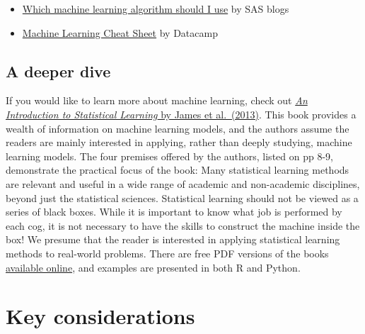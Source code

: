 \documentclass[
]{book}
\providecommand{\tightlist}{%
  \setlength{\itemsep}{0pt}\setlength{\parskip}{0pt}}
\begin{document}
\begin{itemize}
\tightlist
\item
  \href{https://blogs.sas.com/content/subconsciousmusings/2020/12/09/machine-learning-algorithm-use/}{Which machine learning algorithm should I use} by SAS blogs
\item
  \href{https://www.datacamp.com/cheat-sheet/machine-learning-cheat-sheet?utm_source=google\&utm_medium=paid_search\&utm_campaignid=19589720830\&utm_adgroupid=157098107695\&utm_device=c\&utm_keyword=\&utm_matchtype=\&utm_network=g\&utm_adpostion=\&utm_creative=698229375346\&utm_targetid=dsa-2264919291829\&utm_loc_interest_ms=\&utm_loc_physical_ms=9009732\&utm_content=DSA~blog~Julia\&utm_campaign=230119_1-sea~dsa~tofu_2-b2c_3-us_4-prc_5-na_6-na_7-le_8-pdsh-go_9-na_10-na_11-na-may24\&gad_source=1\&gclid=Cj0KCQjw6PGxBhCVARIsAIumnWai3I4X4UtrhM_2dA1pUpmAmC-iErsp57Cv6p4fEQugIVbGrx1VT2YaAsr7EALw_wcB}{Machine Learning Cheat Sheet} by Datacamp
\end{itemize}

\hypertarget{a-deeper-dive}{%
\section{A deeper dive}\label{a-deeper-dive}}

If you would like to learn more about machine learning, check out \href{https://www.statlearning.com/}{\emph{An Introduction to Statistical Learning} by James et al.~(2013)}. This book provides a wealth of information on machine learning models, and the authors assume the readers are mainly interested in applying, rather than deeply studying, machine learning models. The four premises offered by the authors, listed on pp 8-9, demonstrate the practical focus of the book:
Many statistical learning methods are relevant and useful in a wide range of academic and non-academic disciplines, beyond just the statistical sciences.
Statistical learning should not be viewed as a series of black boxes.
While it is important to know what job is performed by each cog, it is not necessary to have the skills to construct the machine inside the box!
We presume that the reader is interested in applying statistical learning methods to real-world problems.
There are free PDF versions of the books \href{https://www.statlearning.com/}{available online}, and examples are presented in both R and Python.

\hypertarget{key-considerations}{%
\chapter{Key considerations}\label{key-considerations}}
\end{document}
